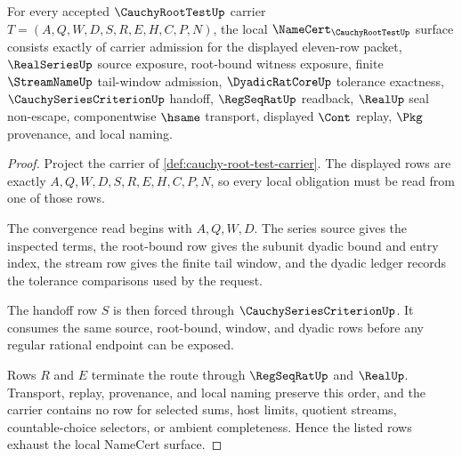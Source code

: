 \begin{theorem}
\label{thm:cauchy-root-test-namecert-obligations}
For every accepted $\CauchyRootTestUp$ carrier $T=(A,Q,W,D,S,R,E,H,C,P,N)$, the local $\NameCert_{\CauchyRootTestUp}$ surface consists exactly of carrier admission for the displayed eleven-row packet, $\RealSeriesUp$ source exposure, root-bound witness exposure, finite $\StreamNameUp$ tail-window admission, $\DyadicRatCoreUp$ tolerance exactness, $\CauchySeriesCriterionUp$ handoff, $\RegSeqRatUp$ readback, $\RealUp$ seal non-escape, componentwise $\hsame$ transport, displayed $\Cont$ replay, $\Pkg$ provenance, and local naming.
\end{theorem}
\begin{proof}
Project the carrier of \autoref{def:cauchy-root-test-carrier}. The displayed rows are exactly $A,Q,W,D,S,R,E,H,C,P,N$, so every local obligation must be read from one of those rows.

The convergence read begins with $A,Q,W,D$. The series source gives the inspected terms, the root-bound row gives the subunit dyadic bound and entry index, the stream row gives the finite tail window, and the dyadic ledger records the tolerance comparisons used by the request.

The handoff row $S$ is then forced through $\CauchySeriesCriterionUp$. It consumes the same source, root-bound, window, and dyadic rows before any regular rational endpoint can be exposed.

Rows $R$ and $E$ terminate the route through $\RegSeqRatUp$ and $\RealUp$. Transport, replay, provenance, and local naming preserve this order, and the carrier contains no row for selected sums, host limits, quotient streams, countable-choice selectors, or ambient completeness. Hence the listed rows exhaust the local NameCert surface.
\end{proof}



